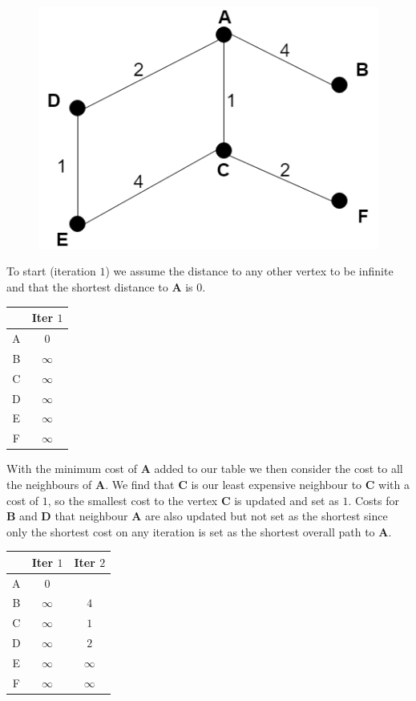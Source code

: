 \documentclass{article}
\begin{document}
\begin{figure}[H]
    \includegraphics[scale=0.5]{images/COMS_review_dj.png}
    \centering
\end{figure}

To start (iteration $1$) we assume the distance to any other vertex to be infinite and that the shortest distance to {\bf A} is $0$.

\begin{center}
 \begin{tabular}{| c || c |} 
 \hline
 \, & Iter $1$ \\ [0.5ex] 
 \hline\hline
A & $0$ \\ 
 \hline
B & $\infty$ \\
 \hline
C & $\infty$ \\
 \hline
D & $\infty$ \\
 \hline
E & $\infty$ \\
 \hline
F & $\infty$ \\
 \hline
\end{tabular}
\end{center}

With the minimum cost of {\bf A} added to our table we then consider the cost to all the neighbours of {\bf A}. We find that {\bf C} is our least expensive neighbour to {\bf C} with a cost of $1$, so the smallest cost to the vertex {\bf C} is updated and set as $1$. Costs for {\bf B} and {\bf D} that neighbour {\bf A} are also updated but not set as the shortest since only the shortest cost on any iteration is set as the shortest overall path to {\bf A}.

\begin{center}
 \begin{tabular}{| c || c | c |} 
 \hline
 \, & Iter $1$ & Iter $2$ \\ [0.5ex] 
 \hline\hline
A & $0$ & \, \\ 
 \hline
B & $\infty$ & $4$ \\
 \hline
C & $\infty$ & $1$ \\
 \hline
D & $\infty$ & $2$ \\
 \hline
E & $\infty$ & $\infty$ \\
 \hline
F & $\infty$ & $\infty$ \\
 \hline
\end{tabular}
\end{center}
\end{document}
